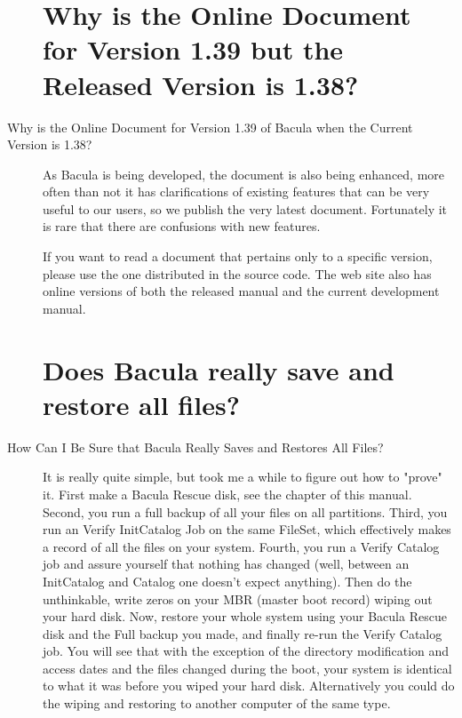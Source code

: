 \begin{description}
\label{docversion}
\section{Why is the Online Document for Version 1.39 but the Released Version is 1.38?}
\item [Why is the Online Document for Version 1.39 of Bacula when the
   Current Version is 1.38?]
As Bacula is being developed, the document is also being enhanced, more
often than not it has clarifications of existing features that can be very
useful to our users, so we publish the very latest document.  Fortunately
it is rare that there are confusions with new features.

If you want to read a document that pertains only to a specific  version,
please use the one distributed in the source code.  The web site also has
online versions of both the released manual and the current development
manual.

\label{sure}
\section{Does Bacula really save and restore all files?}
\item [How Can I Be Sure that Bacula Really Saves and Restores All Files? ]
   It is really quite simple, but took me a while to figure
   out how to "prove" it.  First make a Bacula Rescue disk, see the
    chapter
   of this manual.
   Second, you run a full backup of all your files on all partitions.
   Third, you run an Verify InitCatalog Job on the same FileSet, which
   effectively makes a record of all the files on your system.  Fourth, you
   run a Verify Catalog job and assure yourself that nothing has changed
   (well, between an InitCatalog and Catalog one doesn't expect anything).
   Then do the unthinkable, write zeros on your MBR (master boot record)
   wiping out your hard disk.  Now, restore your whole system using your
   Bacula Rescue disk and the Full backup you made, and finally re-run the
   Verify Catalog job.  You will see that with the exception of the
   directory modification and access dates and the files changed during the
   boot, your system is identical to what it was before you wiped your hard
   disk.
   Alternatively you could do the wiping and restoring to another computer
   of the same type.

\label{upgrade}

\end{description}

